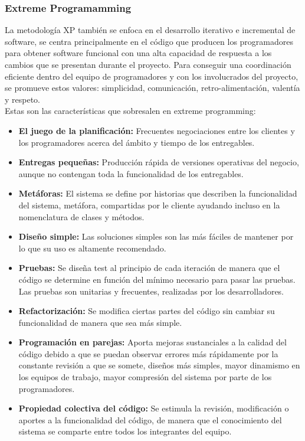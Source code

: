 \documentclass[11pt,openany]{book}
\newcounter{ns}
\begin{document}
		\subsubsection{Extreme Programamming}
		La metodología XP también se enfoca en el desarrollo iterativo e incremental de software, se centra principalmente en el código que producen los programadores para obtener software funcional con una alta capacidad de respuesta a los cambios que se presentan durante el proyecto. Para conseguir una coordinación eficiente dentro del equipo de programadores y con los involucrados del proyecto, se promueve estos valores: simplicidad, comunicación, retro-alimentación, valentía y respeto.\\
		Estas son las características  que sobresalen en extreme programming:
		\begin{itemize}
			\item \textbf{El juego de la planificación: }Frecuentes negociaciones entre los clientes y los programadores acerca del ámbito y tiempo de los entregables.
			\item \textbf{Entregas pequeñas: }Producción rápida de versiones operativas del negocio, aunque no contengan toda la funcionalidad de los entregables.
			\item \textbf{Metáforas: }El sistema se define por historias que describen la funcionalidad del sistema, metáfora, compartidas por le cliente ayudando incluso en la nomenclatura de clases y métodos.
			\item \textbf{Diseño simple: }Las soluciones simples son las más fáciles de mantener por lo que su uso es altamente recomendado.
			\item \textbf{Pruebas: }Se diseña test al principio de cada iteración de manera que el código se determine en función del mínimo necesario para pasar las pruebas. Las pruebas son unitarias y frecuentes, realizadas por los desarrolladores.
			\item \textbf{Refactorización: }Se modifica ciertas partes del código sin cambiar su funcionalidad de manera que sea más simple.
			\item \textbf{Programación en parejas: }Aporta mejoras sustanciales a la calidad del código debido a que se puedan observar errores más rápidamente por la constante revisión a que se somete, diseños más simples, mayor dinamismo en los equipos de trabajo, mayor compresión del sistema por parte de los programadores.
			\item \textbf{Propiedad colectiva del código: }Se estimula la revisión, modificación o aportes a la funcionalidad del código, de manera que el conocimiento del sistema se comparte entre todos los integrantes del equipo.

\end{itemize}
\end{document}
